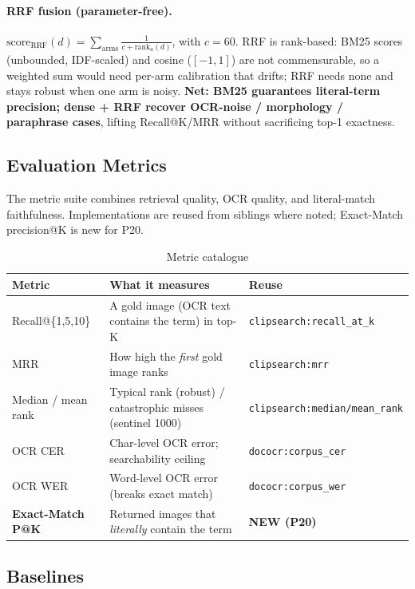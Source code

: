 \documentclass[12pt,a4paper]{article}
\begin{document}
\paragraph{RRF fusion (parameter-free).} $\text{score}_{\text{RRF}}(d)=\sum_{\text{arms}} \frac{1}{c+\text{rank}_a(d)}$, with $c=60$. RRF is rank-based: BM25 scores (unbounded, IDF-scaled) and cosine ($[-1,1]$) are not commensurable, so a weighted sum would need per-arm calibration that drifts; RRF needs none and stays robust when one arm is noisy. \textbf{Net: BM25 guarantees literal-term precision; dense + RRF recover OCR-noise / morphology / paraphrase cases}, lifting Recall@K/MRR without sacrificing top-1 exactness.

\subsection{Evaluation Metrics}

The metric suite combines retrieval quality, OCR quality, and literal-match faithfulness. Implementations are reused from siblings where noted; Exact-Match precision@K is new for P20.

\begin{table}[H]
\centering
\caption{Metric catalogue}
\small
\begin{tabularx}{\linewidth}{@{} l L l @{}}
\toprule
\textbf{Metric} & \textbf{What it measures} & \textbf{Reuse} \\
\midrule
Recall@\{1,5,10\} & A gold image (OCR text contains the term) in top-K & \texttt{clipsearch:recall\_at\_k} \\
MRR & How high the \emph{first} gold image ranks & \texttt{clipsearch:mrr} \\
Median / mean rank & Typical rank (robust) / catastrophic misses (sentinel 1000) & \texttt{clipsearch:median/mean\_rank} \\
OCR CER & Char-level OCR error; searchability ceiling & \texttt{dococr:corpus\_cer} \\
OCR WER & Word-level OCR error (breaks exact match) & \texttt{dococr:corpus\_wer} \\
\textbf{Exact-Match P@K} & Returned images that \emph{literally} contain the term & \textbf{NEW (P20)} \\
\bottomrule
\end{tabularx}
\end{table}

\subsection{Baselines}
\end{document}

